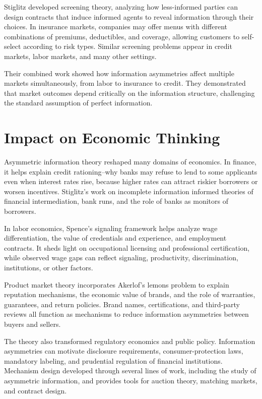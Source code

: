 Stiglitz developed screening theory, analyzing how less-informed parties can
design contracts that induce informed agents to reveal information through their
choices. In insurance markets, companies may offer menus with different
combinations of premiums, deductibles, and coverage, allowing customers to
self-select according to risk types. Similar screening problems appear in credit
markets, labor markets, and many other settings.

Their combined work showed how information asymmetries affect multiple markets
simultaneously, from labor to insurance to credit. They demonstrated that
market outcomes depend critically on the information structure, challenging
the standard assumption of perfect information.

\section{Impact on Economic Thinking}
Asymmetric information theory reshaped many domains of economics. In finance,
it helps explain credit rationing--why banks may refuse to lend to some applicants
even when interest rates rise, because higher rates can attract riskier borrowers
or worsen incentives. Stiglitz's work on incomplete information informed theories
of financial intermediation, bank runs, and the role of banks as monitors of
borrowers.

In labor economics, Spence's signaling framework helps analyze wage
differentiation, the value of credentials and experience, and employment
contracts. It sheds light on occupational licensing and professional
certification, while observed wage gaps can reflect signaling, productivity,
discrimination, institutions, or other factors.

Product market theory incorporates Akerlof's lemons problem to explain
reputation mechanisms, the economic value of brands, and the role of
warranties, guarantees, and return policies. Brand names, certifications, and
third-party reviews all function as mechanisms to reduce information
asymmetries between buyers and sellers.

The theory also transformed regulatory economics and public policy.
Information asymmetries can motivate disclosure requirements, consumer-protection
laws, mandatory labeling, and prudential regulation of financial institutions.
Mechanism design developed through several lines of work, including the study of
asymmetric information, and provides tools for auction theory, matching markets,
and contract design.

